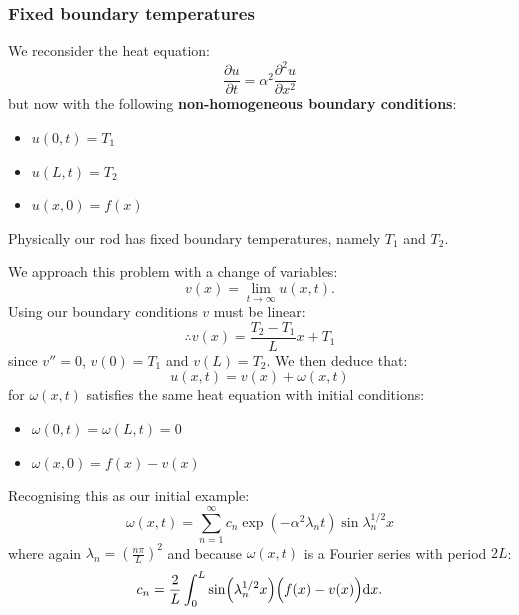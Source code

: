 \documentclass{article}
\begin{document}
\newpage

\subsubsection{Fixed boundary temperatures}
We reconsider the heat equation:
$$\frac{\partial u}{\partial t}=\alpha^2\frac{\partial^2 u}{\partial x^2}$$
but now with the following \textbf{non-homogeneous boundary conditions}:
\begin{itemize}
    \item $u(0,t)=T_1$
    \item $u(L,t)=T_2$
    \item $u(x,0)=f(x)$
\end{itemize}
Physically our rod has fixed boundary temperatures, namely $T_1$ and $T_2$.

We approach this problem with a change of variables:
$$v(x)=\lim_{t\rightarrow\infty}u(x,t).$$
Using our boundary conditions $v$ must be linear:
$$\therefore v(x)=\frac{T_2-T_1}{L}x+T_1$$
since $v''=0$, $v(0)=T_1$ and $v(L)=T_2$. We then deduce that:
$$u(x,t)=v(x)+\omega(x,t)$$
for $\omega(x,t)$ satisfies the same heat equation with initial conditions:
\begin{itemize}
    \item $\omega(0,t)=\omega(L,t)=0$
    \item $\omega(x,0)=f(x)-v(x)$
\end{itemize}
Recognising this as our initial example:
$$\omega(x,t)
=\sum_{n=1}^{\infty}c_n\exp\left(-\alpha^2\lambda_n t\right)
\sin\lambda_n^{1/2} x$$
where again $\lambda_n=\left(\frac{n\pi}{L}\right)^2$ and because $\omega(x,t)$ is a Fourier series with period $2L$:
$$c_n=\frac{2}{L}\int_{0}^{L}\sin(\lambda_n^{1/2} x)\Bigl(f(x)-v(x)\Bigr)\dd x.$$

\newpage
\end{document}
